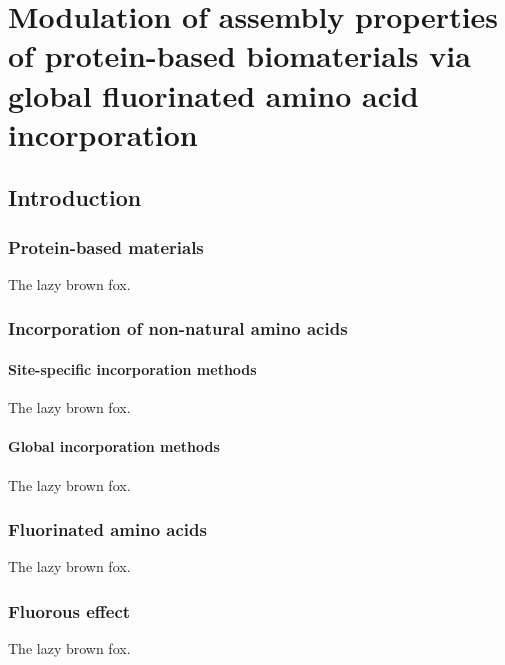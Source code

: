 \chapter{Modulation of assembly properties of protein-based
biomaterials via global fluorinated amino acid incorporation}

\section{Introduction}

\subsection{Protein-based materials}

The lazy brown fox.\cite{Haghpanah:2009qf,Yamano:2011ve,Haghpanah:2010ly,Yuvienco:2012zr}

\subsection{Incorporation of non-natural amino acids}

\subsubsection{Site-specific incorporation methods} 

The lazy brown fox.

\subsubsection{Global incorporation methods} 

The lazy brown fox.

\subsection{Fluorinated amino acids} The lazy brown fox.

\subsection{Fluorous effect} The lazy brown fox.

